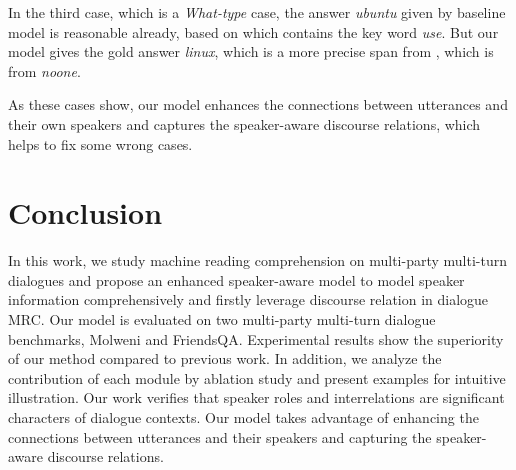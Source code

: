 \documentclass[letterpaper]{article} \usepackage{stylefile}  \usepackage{times}  \usepackage{helvet}  \usepackage{courier}  \usepackage[hyphens]{url}  \usepackage{graphicx} \urlstyle{rm} \def\UrlFont{\rm}  \usepackage{natbib}  \usepackage{caption} \DeclareCaptionStyle{ruled}{labelfont=normalfont,labelsep=colon,strut=off} \frenchspacing  \setlength{\pdfpagewidth}{8.5in}  \setlength{\pdfpageheight}{11in}  \usepackage{algorithm}
\begin{document}
In the third case, which is a \emph{What-type} case, the answer \emph{ubuntu} given by baseline model is reasonable already, based on  which contains the key word \emph{use}. But our model gives the gold answer \emph{linux}, which is a more precise span from , which is from \emph{noone}.

As these cases show, our model enhances the connections between utterances and their own speakers and captures the speaker-aware discourse relations, which helps to fix some wrong cases.
 

\section{Conclusion}
In this work, we study machine reading comprehension on multi-party multi-turn dialogues and propose an enhanced speaker-aware model to model speaker information comprehensively and firstly leverage discourse relation in dialogue MRC. 
Our model is evaluated on two multi-party multi-turn dialogue benchmarks, Molweni and FriendsQA. Experimental results show the superiority of our method compared to previous work. In addition, we analyze the contribution of each module by ablation study and present examples for intuitive illustration. Our work verifies that speaker roles and interrelations are significant characters of dialogue contexts. Our model takes advantage of enhancing the connections between utterances and their speakers and capturing the speaker-aware discourse relations.


\end{document}

